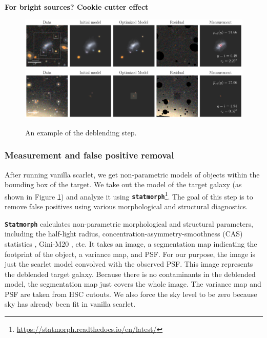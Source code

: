 \documentclass[twocolumn,astrosymb,twocolappendix]{aastex631}
\newcommand{\code}[1]{\textbf{\texttt{#1}}}
\begin{document}
\begin{CJK*}{UTF8}{gbsn}
\textbf{For bright sources? Cookie cutter effect}

\begin{figure}
	\vbox{ 
		\centering
		\includegraphics[width=1\linewidth]{vanilla_scarlet_demo.pdf}
		\includegraphics[width=1\linewidth]{vanilla_scarlet_demo2.pdf}
	}
	\caption{An example of the deblending step.}
	\label{fig:vanilla_scarlet_demo}
\end{figure}


\subsubsection{Measurement and false positive removal}\label{sec:non-par-measurement}
After running vanilla scarlet, we get non-parametric models of objects within the bounding box of the target. We take out the model of the target galaxy (as shown in Figure \ref{fig:vanilla_scarlet_demo}) and analyze it using \code{statmorph}\footnote{\url{https://statmorph.readthedocs.io/en/latest/}}\citep{statmorph}. The goal of this step is to remove false positives using various morphological and structural diagnostics.

\code{Statmorph} calculates non-parametric morphological and structural parameters, including the half-light radius, concentration-asymmetry-smoothness (CAS) statistics \citep{Conselice2003}, Gini-M20 \citep{Lotz2004}, etc. It takes an image, a segmentation map indicating the footprint of the object, a variance map, and PSF. For our purpose, the image is just the scarlet model convolved with the observed PSF. This image represents the deblended target galaxy. Because there is no contaminants in the deblended model, the segmentation map just covers the whole image. The variance map and PSF are taken from HSC cutouts. We also force the sky level to be zero because sky has already been fit in vanilla scarlet. 


\end{CJK*}
\end{document}
